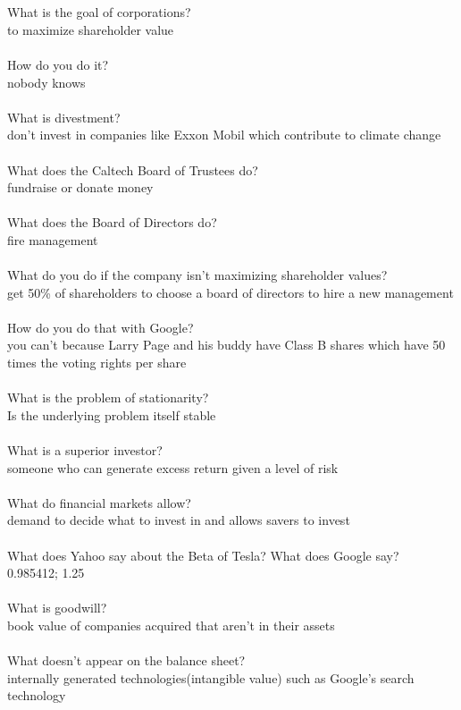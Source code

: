 \documentclass[11pt]{article}
\begin{document}
\\\\What is the goal of corporations?
\\to maximize shareholder value
\\\\How do you do it?
\\nobody knows
\\\\What is divestment?
\\don't invest in companies like Exxon Mobil which contribute to climate change
\\\\What does the Caltech Board of Trustees do?
\\fundraise or donate money
\\\\What does the Board of Directors do?
\\fire management
\\\\What do you do if the company isn't maximizing shareholder values?
\\get 50\% of shareholders to choose a board of directors to hire a new management
\\\\How do you do that with Google?
\\you can't because Larry Page and his buddy have Class B shares which have 50 times the voting rights per share
\\\\What is the problem of stationarity?
\\Is the underlying problem itself stable
\\\\What is a superior investor?
\\someone who can generate excess return given a level of risk
\\\\What do financial markets allow?
\\demand to decide what to invest in and allows savers to invest
\\\\What does Yahoo say about the Beta of Tesla?  What does Google say?
\\0.985412; 1.25
\\\\What is goodwill?
\\book value of companies acquired that aren't in their assets
\\\\What doesn't appear on the balance sheet?
\\internally generated technologies(intangible value) such as Google's search technology
\end{document}
